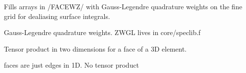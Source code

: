 Fills arrays in /\-F\-A\-C\-E\-W\-Z/ with Gauss-\/\-Legendre quadrature weights on the fine grid for dealiasing surface integrals. 

Gauss-\/\-Legendre quadrature weights. Z\-W\-G\-L lives in core/speclib.\-f

Tensor product in two dimensions for a face of a 3\-D element.

faces are just edges in 1\-D. No tensor product
